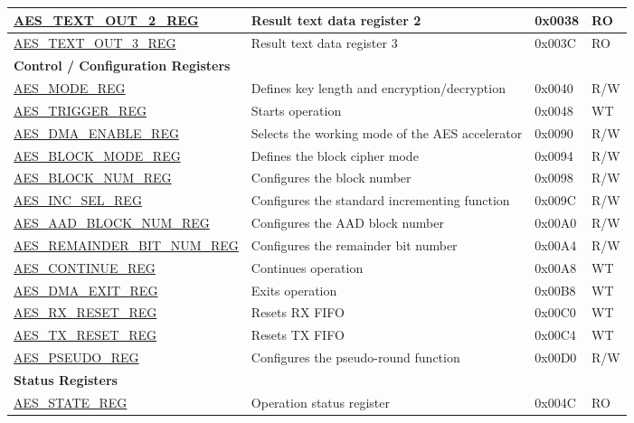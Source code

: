 \begin{longtable}{ | p{6cm} | p{7.2cm} | p{1.3cm} | p{1cm} | }
\hyperref[regdesc:AESTEXTOUTNREG]{AES\_TEXT\_OUT\_2\_REG} & Result text data register 2					& 0x0038 & RO \\ \hline
\hyperref[regdesc:AESTEXTOUTNREG]{AES\_TEXT\_OUT\_3\_REG} & Result text data register 3					& 0x003C & RO \\ \hline
\multicolumn{4}{|l|}{\textbf{Control / Configuration Registers}} \\ \hline
\hyperref[regdesc:AESMODEREG]{AES\_MODE\_REG} & Defines key length and encryption/decryption			    & 0x0040 & R/W \\ \hline
\hyperref[regdesc:AESTRIGGERREG]{AES\_TRIGGER\_REG} &  Starts operation	 & 0x0048 & WT \\ \hline
\hyperref[regdesc:AESDMAENABLEREG]{AES\_DMA\_ENABLE\_REG} & Selects the working mode of the AES accelerator					                & 0x0090 & R/W \\ \hline
\hyperref[regdesc:AESBLOCKMODEREG]{AES\_BLOCK\_MODE\_REG} & Defines the block cipher mode			        & 0x0094 & R/W \\ \hline
\hyperref[regdesc:AESBLOCKNUMREG]{AES\_BLOCK\_NUM\_REG} & Configures the block number  & 0x0098 & R/W \\ \hline
\hyperref[regdesc:AESINCSELREG]{AES\_INC\_SEL\_REG} &  Configures the standard incrementing function  & 0x009C & R/W \\ \hline
\hyperref[regdesc:AESAADBLOCKNUMREG]{AES\_AAD\_BLOCK\_NUM\_REG} & Configures the AAD block number  & 0x00A0 & R/W \\ \hline
\hyperref[regdesc:AESREMAINDERBITNUMREG]{AES\_REMAINDER\_BIT\_NUM\_REG} & Configures the remainder bit number  & 0x00A4 & R/W \\ \hline
\hyperref[regdesc:AESCONTINUEREG]{AES\_CONTINUE\_REG} & Continues operation  & 0x00A8 & WT \\ \hline
\hyperref[regdesc:AESDMAEXITREG]{AES\_DMA\_EXIT\_REG} & Exits operation	& 0x00B8 & WT \\ \hline
\hyperref[regdesc:AESRXRESETREG]{AES\_RX\_RESET\_REG} & Resets RX FIFO & 0x00C0 & WT \\ \hline
\hyperref[regdesc:AESTXRESETREG]{AES\_TX\_RESET\_REG} & Resets TX FIFO & 0x00C4 & WT \\ \hline
\hyperref[regdesc:AESPSEUDOREG]{AES\_PSEUDO\_REG} & Configures the pseudo-round function  & 0x00D0 & R/W \\ \hline
\multicolumn{4}{|l|}{\textbf{Status Registers}} \\ \hline
\hyperref[regdesc:AESSTATEREG]{AES\_STATE\_REG} & Operation status register			& 0x004C & RO \\ \hline

\end{longtable}
